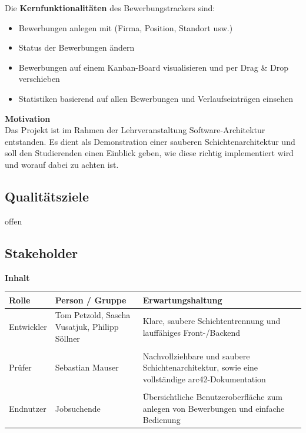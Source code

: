 \documentclass[a4paper,12pt]{article}
\begin{document}
Die \textbf{Kernfunktionalitäten} des Bewerbungstrackers sind:

\begin{itemize}
\item Bewerbungen anlegen mit (Firma, Position, Standort usw.)
\item Status der Bewerbungen ändern
\item Bewerbungen auf einem Kanban-Board visualisieren und per Drag \& Drop verschieben
\item Statistiken basierend auf allen Bewerbungen und Verlaufseinträgen einsehen
\end{itemize}

{\large \textbf{Motivation}}\\
Das Projekt ist im Rahmen der Lehrveranstaltung Software-Architektur entstanden. Es dient als Demonstration einer sauberen Schichtenarchitektur und soll den Studierenden einen Einblick geben, wie diese richtig implementiert wird und worauf dabei zu achten ist.

\subsection{Qualitätsziele}

offen

\subsection{Stakeholder}\label{_stakeholder}

{\large \textbf{Inhalt}}
\begin{longtable}[]{@{}
  >{\raggedright\arraybackslash}p{}
  >{\raggedright\arraybackslash}p{}
  >{\raggedright\arraybackslash}p{}@{}}
\toprule\noalign{}
\textbf{Rolle} & \textbf{Person / Gruppe} & \textbf{Erwartungshaltung} \\
\midrule\noalign{}
\endhead
\bottomrule\noalign{}
\endlastfoot
Entwickler & Tom Petzold, Sascha Vusatjuk, Philipp Söllner & Klare, saubere Schichtentrennung und lauffähiges Front-/Backend \\\\
Prüfer & Sebastian Mauser & Nachvollziehbare und saubere Schichtenarchitektur, sowie eine vollständige arc42-Dokumentation \\\\ 
Endnutzer & Jobsuchende & Übersichtliche Benutzeroberfläche zum anlegen von Bewerbungen und einfache Bedienung\\
\end{longtable}
\newpage
\end{document}
